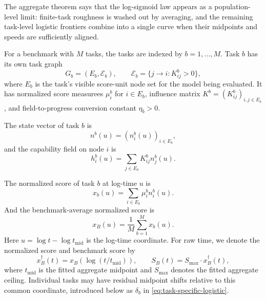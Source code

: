 The aggregate theorem says that the log-sigmoid law appears as a population-level limit: finite-task roughness is washed out by averaging, and the remaining task-level logistic frontiers combine into a single curve when their midpoints and speeds are sufficiently aligned.


\begin{definition}
\label{def:benchmark-task-graph-state}
For a benchmark with $M$ tasks, the tasks are indexed by $b=1,\ldots,M$. Task $b$ has its own task graph
\begin{equation*}
    G_b=(E_b,\mathcal E_b),
    \qquad
    \mathcal E_b=\{j\to i:K_{ij}^b>0\},
\end{equation*}
where $E_b$ is the task's visible score-unit node set for the model being evaluated. It has normalized score measurees $\mu_i^b$ for $i\in E_b$, influence matrix $K^b=(K_{ij}^b)_{i,j\in E_b}$, and field-to-progress conversion constant $\eta_b>0$.

The state vector of task $b$ is
\begin{equation*}
    n^b(u)=(n_i^b(u))_{i\in E_b},
\end{equation*}
and the capability field on node $i$ is
\begin{equation*}
    h_i^b(u)=\sum_{j\in E_b}K_{ij}^b n_j^b(u).
\end{equation*}
\end{definition}

\begin{definition}
\label{def:benchmark-task-score-average}
The normalized score of task $b$ at log-time $u$ is
\begin{equation*}
    x_b(u)=\sum_{i\in E_b}\mu_i^b n_i^b(u).
\end{equation*}
And the benchmark-average normalized score is
\begin{equation*}
    x_B(u)=\frac1M\sum_{b=1}^{M}x_b(u).
\end{equation*}
Here \(u = \log t - \log t_{\mathrm{mid}}\) is the log-time coordinate. For raw time, we denote the normalized score and benchmark score by 
\[ 
x_B^\dagger(t)=x_B(\log(t/t_{\mathrm{mid}})),\qquad S_B(t)=S_{\max} \cdot x_B^\dagger(t),
\] 
where \(t_{\mathrm{mid}}\) is the fitted aggregate midpoint and \(S_{\max}\) denotes the fitted aggregate ceiling. Individual tasks may have residual midpoint shifts relative to this common coordinate, introduced below as \(\delta_b\) in \eqref{eq:task-specific-logistic}.
\end{definition}


